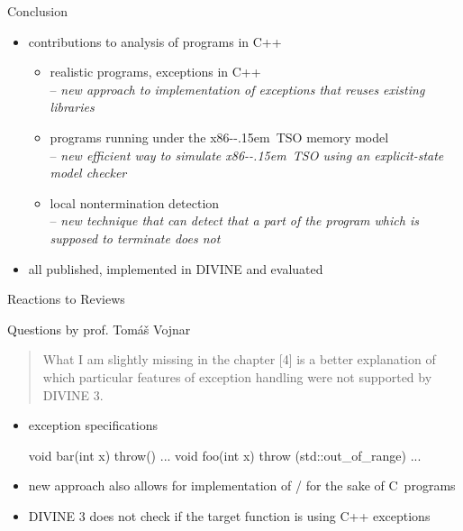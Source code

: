 \documentclass[aspectratio=169, fi]{paradise-slide}
\newcommand{\xtso}{\mbox{x86-\kern-.15em TSO}\xspace}
\newenvironment{prespart}[1]{%
  \begin{frame}{}%
    \centering
      {\Large #1} \par\bigskip\bigskip%
}{%
  \end{frame}%
}
\newcommand{\rquote}[1]{\begin{quote}#1\end{quote}\bigskip\setlength{\leftmargini}{1em}}
\begin{document}
\begin{prespart}{Conclusion}
  \begin{itemize}
    \item contributions to analysis of programs in C++
      \begin{itemize}
        \item realistic programs, exceptions in C++
          \\ – \emph{new approach to implementation of exceptions that reuses existing libraries}
          \medskip\pause
        \item programs running under the \xtso memory model
          \\ – \emph{new efficient way to simulate \xtso using an explicit-state model checker}
          \medskip\pause
        \item local nontermination detection
          \\ – \emph{new technique that can detect that a part of the program which is supposed to
          terminate does not}
          \medskip\pause
      \end{itemize}
    \item all published, implemented in DIVINE and evaluated
  \end{itemize}
\end{prespart}

\def\insertframenumber{A}
\begin{frame}[noframenumbering]{}
    \centering
      {\Large Reactions to Reviews}
\end{frame}

\def\rname{prof. Tomáš Vojnar}
\def\qtitle{Questions by \rname}

\begin{frame}{\qtitle}
\rquote{What I am slightly missing in the chapter [4] is a better explanation of which particular features
of exception handling were not supported by DIVINE 3.}

  \begin{itemize}
    \item exception specifications
      \begin{cppcode}
        void bar(int x) throw() { ... }
        void foo(int x) throw (std::out_of_range) { ... }
      \end{cppcode}
    \item new approach also allows for implementation of / for the sake of
      C~programs
    \item DIVINE 3 does not check if the target function is using C++ exceptions
  \end{itemize}
\end{frame}
\end{document}
